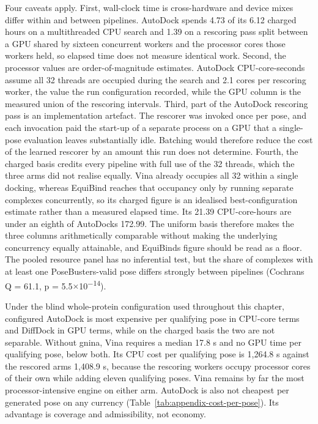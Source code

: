 Four caveats apply. First, wall-clock time is cross-hardware and device mixes differ within and between pipelines. AutoDock spends 4.73 of its 6.12 charged hours on a multithreaded CPU search and 1.39 on a rescoring pass split between a GPU shared by sixteen concurrent workers and the processor cores those workers held, so elapsed time does not measure identical work. Second, the processor values are order-of-magnitude estimates. AutoDock CPU-core-seconds assume all 32 threads are occupied during the search and 2.1 cores per rescoring worker, the value the run configuration recorded, while the GPU column is the measured union of the rescoring intervals. Third, part of the AutoDock rescoring pass is an implementation artefact. The rescorer was invoked once per pose, and each invocation paid the start-up of a separate process on a GPU that a single-pose evaluation leaves substantially idle. Batching would therefore reduce the cost of the learned rescorer by an amount this run does not determine. Fourth, the charged basis credits every pipeline with full use of the 32 threads, which the three arms did not realise equally. Vina already occupies all 32 within a single docking, whereas EquiBind reaches that occupancy only by running separate complexes concurrently, so its charged figure is an idealised best-configuration estimate rather than a measured elapsed time. Its 21.39 CPU-core-hours are under an eighth of AutoDock\textquotesingle s 172.99. The uniform basis therefore makes the three columns arithmetically comparable without making the underlying concurrency equally attainable, and EquiBind\textquotesingle s figure should be read as a floor. The pooled resource panel has no inferential test, but the share of complexes with at least one PoseBusters-valid pose differs strongly between pipelines (Cochran\textquotesingle s Q = 61.1, p = 5.5\ensuremath{\times}10\textsuperscript{\ensuremath{-}14}).

Under the blind whole-protein configuration used throughout this chapter, configured AutoDock is most expensive per qualifying pose in CPU-core terms and DiffDock in GPU terms, while on the charged basis the two are not separable. Without gnina, Vina requires a median 17.8 s and no GPU time per qualifying pose, below both. Its CPU cost per qualifying pose is 1,264.8 s against the rescored arm\textquotesingle{}s 1,408.9 s, because the rescoring workers occupy processor cores of their own while adding eleven qualifying poses. Vina remains by far the most processor-intensive engine on either arm. AutoDock is also not cheapest per generated pose on any currency (Table~\ref{tab:appendix-cost-per-pose}). Its advantage is coverage and admissibility, not economy.

